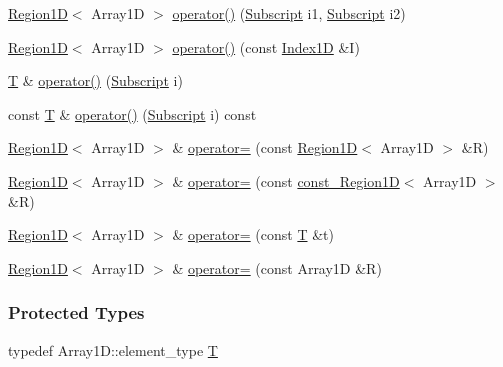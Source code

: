 \begin{DoxyCompactItemize}
\item 
\hyperlink{class_t_n_t_1_1_region1_d}{Region1D}$<$ Array1D $>$ \hyperlink{class_t_n_t_1_1_region1_d_ae89e709d061db46d01f81915ad1ef2a3}{operator()} (\hyperlink{namespace_t_n_t_af22e3f1460e145c04ce4e7d701e4c1c1}{Subscript} i1, \hyperlink{namespace_t_n_t_af22e3f1460e145c04ce4e7d701e4c1c1}{Subscript} i2)
\item 
\hyperlink{class_t_n_t_1_1_region1_d}{Region1D}$<$ Array1D $>$ \hyperlink{class_t_n_t_1_1_region1_d_ab16b6d73eedf4c5ac6272ddab07f5011}{operator()} (const \hyperlink{class_t_n_t_1_1_index1_d}{Index1D} \&I)
\item 
\hyperlink{class_t_n_t_1_1_region1_d_aeaa00e15430d932464854304c140396f}{T} \& \hyperlink{class_t_n_t_1_1_region1_d_a45aabce2112867e33b38fd7b4b2887c5}{operator()} (\hyperlink{namespace_t_n_t_af22e3f1460e145c04ce4e7d701e4c1c1}{Subscript} i)
\item 
const \hyperlink{class_t_n_t_1_1_region1_d_aeaa00e15430d932464854304c140396f}{T} \& \hyperlink{class_t_n_t_1_1_region1_d_a5172f463dfd918754575e126945feba7}{operator()} (\hyperlink{namespace_t_n_t_af22e3f1460e145c04ce4e7d701e4c1c1}{Subscript} i) const 
\item 
\hyperlink{class_t_n_t_1_1_region1_d}{Region1D}$<$ Array1D $>$ \& \hyperlink{class_t_n_t_1_1_region1_d_acb7d3cb1f5b71d6a079d030259917421}{operator=} (const \hyperlink{class_t_n_t_1_1_region1_d}{Region1D}$<$ Array1D $>$ \&R)
\item 
\hyperlink{class_t_n_t_1_1_region1_d}{Region1D}$<$ Array1D $>$ \& \hyperlink{class_t_n_t_1_1_region1_d_a8425fdbb246816152e5c6f08a65e83ad}{operator=} (const \hyperlink{class_t_n_t_1_1const___region1_d}{const\_\-Region1D}$<$ Array1D $>$ \&R)
\item 
\hyperlink{class_t_n_t_1_1_region1_d}{Region1D}$<$ Array1D $>$ \& \hyperlink{class_t_n_t_1_1_region1_d_a291a8d1f52c59055d4250739d80a9c47}{operator=} (const \hyperlink{class_t_n_t_1_1_region1_d_aeaa00e15430d932464854304c140396f}{T} \&t)
\item 
\hyperlink{class_t_n_t_1_1_region1_d}{Region1D}$<$ Array1D $>$ \& \hyperlink{class_t_n_t_1_1_region1_d_a6c429fd131382f79b2974ef4ca1256f2}{operator=} (const Array1D \&R)
\end{DoxyCompactItemize}
\subsubsection*{Protected Types}
\begin{DoxyCompactItemize}
\item 
typedef Array1D::element\_\-type \hyperlink{class_t_n_t_1_1_region1_d_aeaa00e15430d932464854304c140396f}{T}
\end{DoxyCompactItemize}
